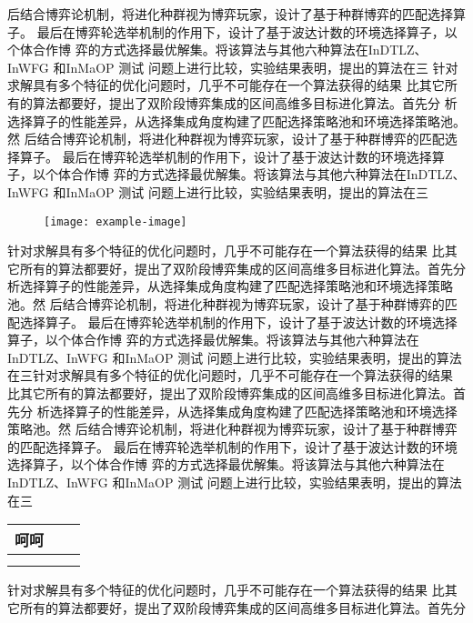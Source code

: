 后结合博弈论机制，将进化种群视为博弈玩家，设计了基于种群博弈的匹配选择算子。
最后在博弈轮选举机制的作用下，设计了基于波达计数的环境选择算子，以个体合作博
弈的方式选择最优解集。将该算法与其他六种算法在InDTLZ、InWFG 和InMaOP 测试
问题上进行比较，实验结果表明，提出的算法在三
针对求解具有多个特征的优化问题时，几乎不可能存在一个算法获得的结果
比其它所有的算法都要好，提出了双阶段博弈集成的区间高维多目标进化算法。首先分
析选择算子的性能差异，从选择集成角度构建了匹配选择策略池和环境选择策略池。然
后结合博弈论机制，将进化种群视为博弈玩家，设计了基于种群博弈的匹配选择算子。
最后在博弈轮选举机制的作用下，设计了基于波达计数的环境选择算子，以个体合作博
弈的方式选择最优解集。将该算法与其他六种算法在InDTLZ、InWFG 和InMaOP 测试
问题上进行比较，实验结果表明，提出的算法在三
\begin{figure}[htp]
	\centering
	\texttt{[image: example-image]}
\end{figure}
针对求解具有多个特征的优化问题时，几乎不可能存在一个算法获得的结果
比其它所有的算法都要好，提出了双阶段博弈集成的区间高维多目标进化算法。首先分
析选择算子的性能差异，从选择集成角度构建了匹配选择策略池和环境选择策略池。然
后结合博弈论机制，将进化种群视为博弈玩家，设计了基于种群博弈的匹配选择算子。
最后在博弈轮选举机制的作用下，设计了基于波达计数的环境选择算子，以个体合作博
弈的方式选择最优解集。将该算法与其他六种算法在InDTLZ、InWFG 和InMaOP 测试
问题上进行比较，实验结果表明，提出的算法在三针对求解具有多个特征的优化问题时，几乎不可能存在一个算法获得的结果
比其它所有的算法都要好，提出了双阶段博弈集成的区间高维多目标进化算法。首先分
析选择算子的性能差异，从选择集成角度构建了匹配选择策略池和环境选择策略池。然
后结合博弈论机制，将进化种群视为博弈玩家，设计了基于种群博弈的匹配选择算子。
最后在博弈轮选举机制的作用下，设计了基于波达计数的环境选择算子，以个体合作博
弈的方式选择最优解集。将该算法与其他六种算法在InDTLZ、InWFG 和InMaOP 测试
问题上进行比较，实验结果表明，提出的算法在三
\begin{table}[H]
	\centering
	\label{第1个表}
	\begin{tabular}{ccc}
		\toprule
		呵呵&    &   \\
		\midrule
		&    &   \\
		\midrule
		&    &   \\
		\bottomrule
	\end{tabular}
\end{table}
针对求解具有多个特征的优化问题时，几乎不可能存在一个算法获得的结果
比其它所有的算法都要好，提出了双阶段博弈集成的区间高维多目标进化算法。首先分
